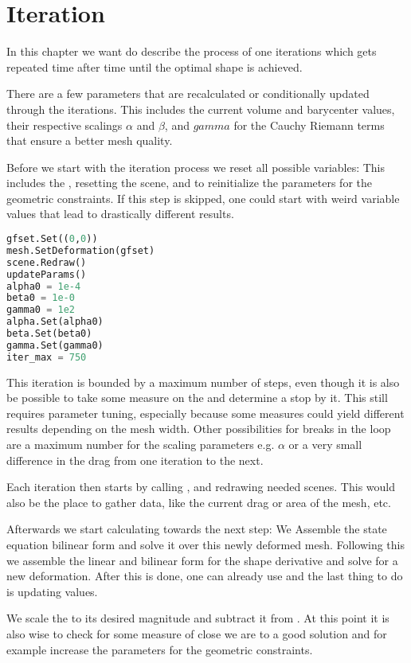 \section{Iteration}
In this chapter we want do describe the process of one iterations which gets repeated time after time until the optimal shape is achieved.

There are a few parameters that are recalculated or conditionally updated through the iterations. This includes the current volume and barycenter values, their respective scalings $\alpha$ and $\beta$, and $gamma$ for the Cauchy Riemann terms that ensure a better mesh quality.

Before we start with the iteration process we reset all possible variables:
This includes the , resetting the scene, and to reinitialize the parameters for the geometric constraints. If this step is skipped, one could start with weird variable values that lead to drastically different results.

\begin{lstlisting}[language=Python, title=Reset before iteration, label=lst:reset]
gfset.Set((0,0))
mesh.SetDeformation(gfset)
scene.Redraw()
updateParams()
alpha0 = 1e-4
beta0 = 1e-0
gamma0 = 1e2
alpha.Set(alpha0)
beta.Set(beta0)
gamma.Set(gamma0)
iter_max = 750
\end{lstlisting}

This iteration is bounded by a maximum number of steps, even though it is also be possible to take some measure on the  and determine a stop by it.
This still requires parameter tuning, especially because some measures could yield different results depending on the mesh width.
Other possibilities for breaks in the loop are a maximum number for the scaling parameters e.g. $\alpha$ or a very small difference in the drag from one iteration to the next.

Each iteration then starts by calling , and redrawing needed scenes. This would also be the place to gather data, like the current drag or area of the mesh, etc.

Afterwards we start calculating towards the next step:
We Assemble the state equation bilinear form and solve it over this newly deformed mesh. Following this we assemble the linear and bilinear form for the shape derivative and solve for a new deformation. After this is done, one can already use  and the last thing to do is updating values.

We scale the  to its desired magnitude and subtract it from . At this point it is also wise to check for some measure of close we are to a good solution and for example increase the parameters for the geometric constraints.

